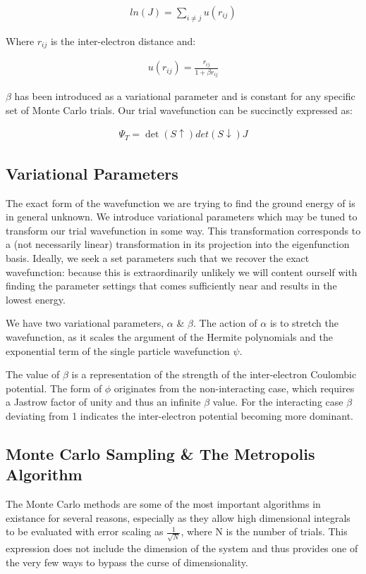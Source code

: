 \documentclass[11pt, conference, compsocconf]{IEEEtran}
\begin{document}
\begin{align}ln\left(J\right)=\sum\limits_{i\neq j} u\left(r_{ij}\right)\end{align}

Where $r_{ij}$ is the inter-electron distance and:

\begin{align}u\left(r_{ij}\right) = \frac{r_{ij}}{1 + \beta r_{ij}}\end{align}

$\beta$ has been introduced as a variational parameter and is constant for any specific set of Monte Carlo trials. Our trial wavefunction can be succinctly expressed as:

\begin{align}\Psi_T = \det\left(S\uparrow\right)det\left(S\downarrow\right)J\end{align}

\subsection{Variational Parameters}
The exact form of the wavefunction we are trying to find the ground energy of is in general unknown. We introduce variational parameters which may be tuned to transform our trial wavefunction in some way. This transformation corresponds to a (not necessarily linear) transformation in its projection into the eigenfunction basis. Ideally, we seek a set parameters such that we recover the exact wavefunction: because this is extraordinarily unlikely we will content ourself with finding the parameter settings that comes sufficiently near and results in the lowest energy. 

We have two variational parameters, $\alpha$ \& $\beta$. The action of $\alpha$ is to stretch the wavefunction, as it scales the argument of the Hermite polynomials and the exponential term of the single particle wavefunction $\psi$. 

The value of $\beta$ is a representation of the strength of the inter-electron Coulombic potential. The form of $\phi$ originates from the non-interacting case, which requires a Jastrow factor of unity and thus an infinite $\beta$ value. For the interacting case $\beta$ deviating from 1 indicates the inter-electron potential becoming more dominant. 

\subsection{Monte Carlo Sampling \& The Metropolis Algorithm}
The Monte Carlo methods are some of the most important algorithms in existance for several reasons, especially as they allow high dimensional integrals to be evaluated with error scaling as $\frac{1}{\sqrt{N}}$, where N is the number of trials. This expression does not include the dimension of the system and thus provides one of the very few ways to bypass the curse of dimensionality. 
\end{document}
